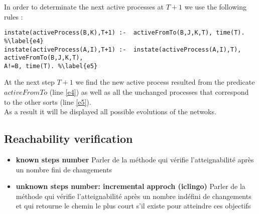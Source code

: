 In order to determinate the next active processes at $T+1$ we use the following rules :
\begin{lstlisting}
instate(activeProcess(B,K),T+1) :-  activeFromTo(B,J,K,T), time(T). %\label{e4}
instate(activeProcess(A,I),T+1) :-  instate(activeProcess(A,I),T), activeFromTo(B,J,K,T),
A!=B, time(T). %\label{e5}
\end{lstlisting}

At the next step $T+1$ we find the new active process resulted from the predicate $activeFromTo$ (line \ref{e4}) as well as all the unchanged processes that correspond to the other sorts (line \ref{e5}).\\
As a result it will be displayed all possible evolutions of the netwoks.
\subsection{Reachability verification}
\begin{itemize}


\item \textbf{known steps number } 
Parler de la méthode qui vérifie l'atteignabilité après un nombre fini de changements
\item \textbf{unknown steps number: incremental approch (iclingo)}
Parler de la méthode qui vérifie l'atteignabilité après un nombre indéfini de changements et qui retourne le chemin le plus court s'il existe pour atteindre ces objectifs
\end{itemize}